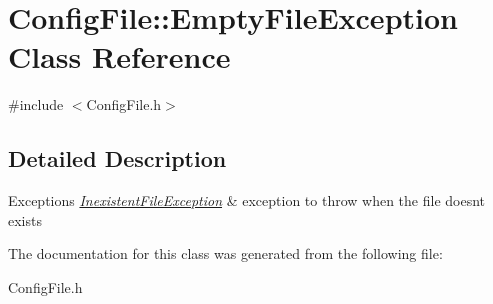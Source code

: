 \hypertarget{class_config_file_1_1_empty_file_exception}{}\section{Config\+File\+:\+:Empty\+File\+Exception Class Reference}
\label{class_config_file_1_1_empty_file_exception}


{\ttfamily \#include $<$Config\+File.\+h$>$}



\subsection{Detailed Description}

\begin{DoxyExceptions}{Exceptions}
{\em \hyperlink{class_config_file_1_1_inexistent_file_exception}{Inexistent\+File\+Exception}} & exception to throw when the file doesn\textquotesingle{}t exists \\
\hline
\end{DoxyExceptions}


The documentation for this class was generated from the following file\+:\begin{DoxyCompactItemize}
\item 
Config\+File.\+h\end{DoxyCompactItemize}
